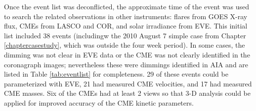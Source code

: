 Once the event list was deconflicted, the approximate time of the event was used to search the related observations in other instruments: flares from GOES X-ray flux, CMEs from LASCO and COR, and solar irradiance from EVE. This initial list included 38 events (includingw the 2010 August 7 simple case from Chapter \ref{chaptercasestudy}, which was outside the four week period). In some cases, the dimming was not clear in EVE data or the CME was not clearly identified in the coronagraph images; nevertheless these were dimmings identified in AIA and are listed in Table \ref{tab:eventlist} for completeness. 29 of these events could be parameterized with EVE, 21 had measured CME velocities, and 17 had measured CME masses. Six of the CMEs had at least 2 views so that 3-D analysis could be applied for improved accuracy of the CME kinetic parameters.

